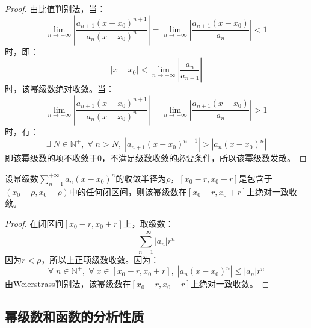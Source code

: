 \begin{proof}
	由比值判别法，当：
	\begin{equation*}
		\lim_{n\to+\infty}\left|\frac{a_{n+1}(x-x_0)^{n+1}}{a_n(x-x_0)^n}\right|=\lim_{n\to+\infty}\left|\frac{a_{n+1}(x-x_0)}{a_n}\right|<1
	\end{equation*}
	时，即：
	\begin{equation*}
		|x-x_0|<\lim_{n\to+\infty}\left|\frac{a_n}{a_{n+1}}\right|
	\end{equation*}
	时，该幂级数绝对收敛。当：
	\begin{equation*}
		\lim_{n\to+\infty}\left|\frac{a_{n+1}(x-x_0)^{n+1}}{a_n(x-x_0)^n}\right|=\lim_{n\to+\infty}\left|\frac{a_{n+1}(x-x_0)}{a_n}\right|>1
	\end{equation*}
	时，有：
	\begin{equation*}
		\exists\;N\in\mathbb{N}^+,\;\forall\;n>N,\;|a_{n+1}(x-x_0)^{n+1}|>|a_n(x-x_0)^n|
	\end{equation*}
	即该幂级数的项不收敛于$0$，不满足级数收敛的必要条件，所以该幂级数发散。
\end{proof}
\begin{theorem}
	设幂级数$\sum\limits_{n=1}^{+\infty}a_n(x-x_0)^n$的收敛半径为$\rho$，$[x_0-r,x_0+r]$是包含于$(x_0-\rho,x_0+\rho)$中的任何闭区间，则该幂级数在$[x_0-r,x_0+r]$上绝对一致收敛。
\end{theorem}
\begin{proof}
	在闭区间$[x_0-r,x_0+r]$上，取级数：
	\begin{equation*}
		\sum_{n=1}^{+\infty}|a_n|r^n
	\end{equation*}
	因为$r<\rho$，所以上正项级数收敛。因为：
	\begin{equation*}
		\forall\;n\in\mathbb{N}^+,\;\forall\;x\in[x_0-r,x_0+r],\;|a_n(x-x_0)^n|\leqslant|a_n|r^n
	\end{equation*}
	由Weierstrass判别法，该幂级数在$[x_0-r,x_0+r]$上绝对一致收敛。
\end{proof}

\subsection{幂级数和函数的分析性质}
